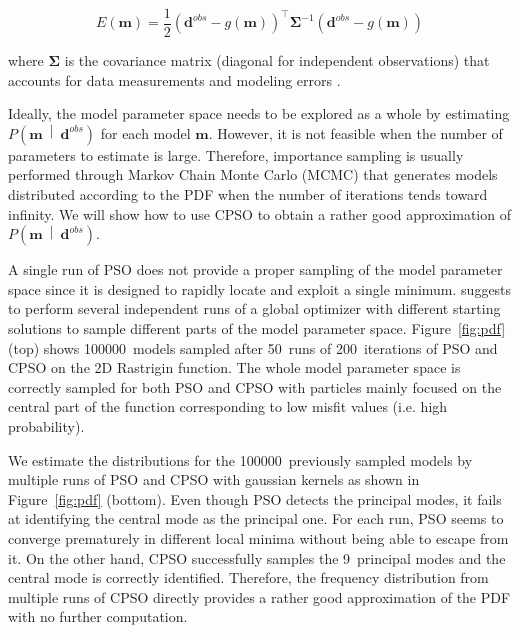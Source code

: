 \begin{equation}
	E \left( \mathbf{m} \right) = \frac{1}{2} \left( \mathbf{d}^{obs} - g \left( \mathbf{m} \right) \right)^{\top} \mathbf{\Sigma}^{-1} \left( \mathbf{d}^{obs} - g \left( \mathbf{m} \right) \right)
	\label{eq:ls_misfit}
\end{equation}

\noindent where $\mathbf{\Sigma}$ is the covariance matrix (diagonal for independent observations) that accounts for data measurements and modeling errors \citep{Tarantola2005}.

Ideally, the model parameter space needs to be explored as a whole by estimating $P \left( \mathbf{m} \ \middle| \  \mathbf{d}^{obs} \right)$ for each model $\mathbf{m}$. However, it is not feasible when the number of parameters to estimate is large. Therefore, importance sampling is usually performed through Markov Chain Monte Carlo (MCMC) that generates models distributed according to the PDF when the number of iterations tends toward infinity. We will show how to use CPSO to obtain a rather good approximation of $P \left( \mathbf{m} \ \middle| \  \mathbf{d}^{obs} \right)$.

A single run of PSO does not provide a proper sampling of the model parameter space since it is designed to rapidly locate and exploit a single minimum. \cite{Sen1996} suggests to perform several independent runs of a global optimizer with different starting solutions to sample different parts of the model parameter space. Figure~\ref{fig:pdf} (top) shows 100000~models sampled after 50~runs of 200~iterations of PSO and CPSO on the 2D Rastrigin function. The whole model parameter space is correctly sampled for both PSO and CPSO with particles mainly focused on the central part of the function corresponding to low misfit values (i.e. high probability).

We estimate the distributions for the 100000~previously sampled models by multiple runs of PSO and CPSO with gaussian kernels as shown in Figure~\ref{fig:pdf} (bottom). Even though PSO detects the principal modes, it fails at identifying the central mode as the principal one. For each run, PSO seems to converge prematurely in different local minima without being able to escape from it. On the other hand, CPSO successfully samples the 9~principal modes and the central mode is correctly identified. Therefore, the frequency distribution from multiple runs of CPSO directly provides a rather good approximation of the PDF with no further computation.

